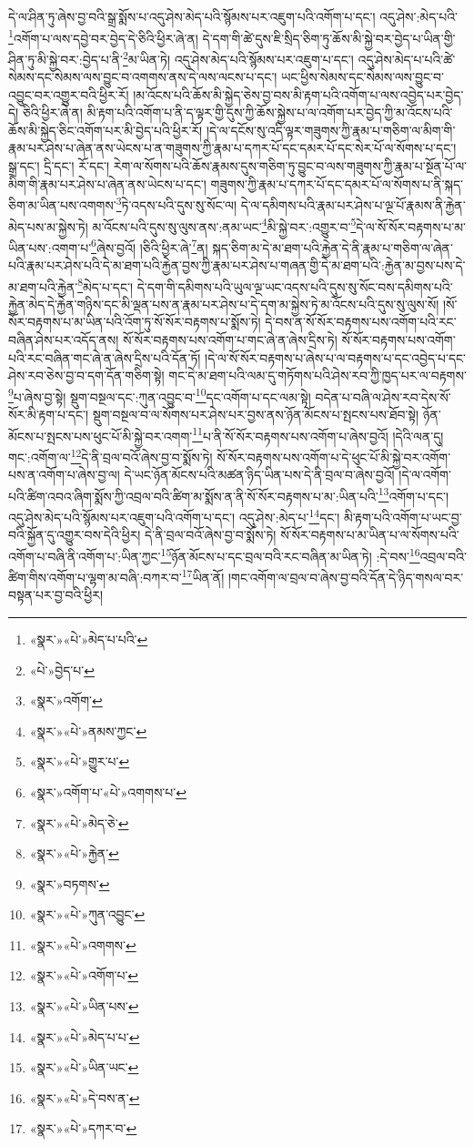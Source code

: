 དེ་ལ་ཤིན་ཏུ་ཞེས་བྱ་བའི་སྒྲ་སྨོས་པ་འདུ་ཤེས་མེད་པའི་སྙོམས་པར་འཇུག་པའི་འགོག་པ་དང་། འདུ་ཤེས་:མེད་པའི་\footnote{«སྣར་»«པེ་»མེད་པ་པའི་}འགོག་པ་ལས་དབྱེ་བར་བྱེད་དེ་ཅིའི་ཕྱིར་ཞེ་ན། དེ་དག་གི་ཚེ་དུས་ཇི་སྲིད་ཅིག་ཏུ་ཆོས་མི་སྐྱེ་བར་བྱེད་པ་ཡིན་གྱི་ཤིན་ཏུ་མི་སྐྱེ་བར་:བྱེད་པ་ནི་\footnote{«པེ་»བྱེད་པ་}མ་ཡིན་ཏེ། འདུ་ཤེས་མེད་པའི་སྙོམས་པར་འཇུག་པ་དང་། འདུ་ཤེས་མེད་པ་པའི་ཚེ་སེམས་དང་སེམས་ལས་བྱུང་བ་འགགས་ནས་དེ་ལས་ལངས་པ་དང་། ཡང་ཕྱིས་སེམས་དང་སེམས་ལས་བྱུང་བ་འབྱུང་བར་འགྱུར་བའི་ཕྱིར་རོ། །མ་འོངས་པའི་ཆོས་མི་སྐྱེད་ཅེས་བྱ་བས་མི་རྟག་པའི་འགོག་པ་ལས་འབྱེད་པར་བྱེད་དེ། ཅིའི་ཕྱིར་ཞེ་ན། མི་རྟག་པའི་འགོག་པ་ནི་ད་ལྟར་གྱི་དུས་ཀྱི་ཆོས་སྐྱེས་པ་ལ་འགོག་པར་བྱེད་ཀྱི་མ་འོངས་པའི་ཆོས་མི་སྐྱེད་ཅིང་འགོག་པར་མི་བྱེད་པའི་ཕྱིར་རོ། །དེ་ལ་དངོས་སུ་འདི་ལྟར་གཟུགས་ཀྱི་རྣམ་པ་གཅིག་ལ་མིག་གི་རྣམ་པར་ཤེས་པ་ཞེན་ནས་ཡེངས་པ་ན་གཟུགས་ཀྱི་རྣམ་པ་དཀར་པོ་དང་དམར་པོ་དང་སེར་པོ་ལ་སོགས་པ་དང་། སྒྲ་དང་། དྲི་དང་། རོ་དང་། རེག་ལ་སོགས་པའི་ཆོས་རྣམས་དུས་གཅིག་ཏུ་བྱུང་བ་ལས་གཟུགས་ཀྱི་རྣམ་པ་སྔོན་པོ་ལ་མིག་གི་རྣམ་པར་ཤེས་པ་ཞེན་ནས་ཡེངས་པ་དང་། གཟུགས་ཀྱི་རྣམ་པ་དཀར་པོ་དང་དམར་པོ་ལ་སོགས་པ་ནི་སྐད་ཅིག་མ་ཡིན་པས་འགགས་\footnote{«སྣར་»འགོག་}ཏེ་འདས་པའི་དུས་སུ་སོང་ལ། དེ་ལ་དམིགས་པའི་རྣམ་པར་ཤེས་པ་ལྔ་པོ་རྣམས་ནི་རྐྱེན་མེད་པས་མ་སྐྱེས་ཏེ། མ་འོངས་པའི་དུས་སུ་ལུས་ནས་:ནམ་ཡང་\footnote{«སྣར་»«པེ་»ནམས་ཀྱང་}མི་སྐྱེ་བར་:འགྱུར་བ་\footnote{«སྣར་»«པེ་»གྱུར་པ་}དེ་ལ་སོ་སོར་བརྟགས་པ་མ་ཡིན་པས་:འགག་པ་\footnote{«སྣར་»འགོག་པ་«པེ་»འགགས་པ་}ཞེས་བྱའོ། །ཅིའི་ཕྱིར་ཞེ་\footnote{«སྣར་»«པེ་»མེད་ཅེ་}ན། སྐད་ཅིག་མ་དེ་མ་ཐག་པའི་རྐྱེན་དེ་ནི་རྣམ་པ་གཅིག་ལ་ཞེན་པའི་རྣམ་པར་ཤེས་པའི་དེ་མ་ཐག་པའི་རྐྱེན་བྱས་ཀྱི་རྣམ་པར་ཤེས་པ་གཞན་གྱི་དེ་མ་ཐག་པའི་:རྐྱེན་མ་བྱས་པས་དེ་མ་ཐག་པའི་རྐྱེན་\footnote{«སྣར་»«པེ་»རྐྱེན་}མེད་པ་དང་། དེ་དག་གི་དམིགས་པའི་ཡུལ་ལྔ་ཡང་འདས་པའི་དུས་སུ་སོང་བས་དམིགས་པའི་རྐྱེན་མེད་དེ་རྐྱེན་གཉིས་དང་མི་ལྡན་པས་ན་རྣམ་པར་ཤེས་པ་དེ་དག་མ་སྐྱེས་ཏེ་མ་འོངས་པའི་དུས་སུ་ལུས་སོ། །སོ་སོར་བརྟགས་པ་མ་ཡིན་པའི་འོག་ཏུ་སོ་སོར་བརྟགས་པ་སྨོས་ཏེ། དེ་བས་ན་སོ་སོར་བརྟགས་པས་འགོག་པའི་རང་བཞིན་ཤེས་པར་འདོད་ནས། སོ་སོར་བརྟགས་པས་འགོག་པ་གང་ཞེ་ན་ཞེས་དྲིས་ཏེ། སོ་སོར་བརྟགས་པས་འགོག་པའི་རང་བཞིན་གང་ཞེ་ན་ཞེས་དྲིས་པའི་དོན་ཏོ། །དེ་ལ་སོ་སོར་བརྟགས་པ་ཞེས་པ་ལ་བརྟགས་པ་དང་འབྱེད་པ་དང་ཤེས་རབ་ཅེས་བྱ་བ་དག་དོན་གཅིག་སྟེ། གང་དེ་མ་ཐག་པའི་ལམ་དུ་གཏོགས་པའི་ཤེས་རབ་ཀྱི་ཁྱད་པར་ལ་བརྟགས་\footnote{«སྣར་»བཏགས་}པ་ཞེས་བྱ་སྟེ། སྡུག་བསྔལ་དང་:ཀུན་འབྱུང་བ་\footnote{«སྣར་»«པེ་»ཀུན་འབྱུང་}དང་འགོག་པ་དང་ལམ་སྟེ། བདེན་པ་བཞི་ལ་ཤེས་རབ་དེས་སོ་སོར་མི་རྟག་པ་དང་། སྡུག་བསྔལ་བ་ལ་སོགས་པར་ཤེས་པར་བྱས་ནས་ཉོན་མོངས་པ་སྤངས་པས་ཐོབ་སྟེ། ཉོན་མོངས་པ་སྤངས་པས་ཕུང་པོ་མི་སྐྱེ་བར་འགག་\footnote{«སྣར་»«པེ་»འགགས་}པ་ནི་སོ་སོར་བརྟགས་པས་འགོག་པ་ཞེས་བྱའོ། །དེའི་ལན་དུ། གང་:འགོག་ལ་\footnote{«སྣར་»«པེ་»འགོག་པ་}དེ་ནི་བྲལ་བའོ་ཞེས་བྱ་བ་སྨོས་ཏེ། སོ་སོར་བརྟགས་པས་འགོག་པ་དེ་ཕུང་པོ་མི་སྐྱེ་བར་འགོག་པས་ན་འགོག་པ་ཞེས་བྱ་ལ། དེ་ཡང་ཉོན་མོངས་པའི་མཚན་ཉིད་ཡིན་པས་དེ་ནི་བྲལ་བ་ཞེས་བྱའོ། །དེ་ལ་འགོག་པའི་ཚིག་འབའ་ཞིག་སྨོས་ཀྱི་འབྲལ་བའི་ཚིག་མ་སྨོས་ན་ནི་སོ་སོར་བརྟགས་པ་མ་:ཡིན་པའི་\footnote{«སྣར་»«པེ་»ཡིན་པས་}འགོག་པ་དང་། འདུ་ཤེས་མེད་པའི་སྙོམས་པར་འཇུག་པའི་འགོག་པ་དང་། འདུ་ཤེས་:མེད་པ་\footnote{«སྣར་»«པེ་»མེད་པ་པ་}དང་། མི་རྟག་པའི་འགོག་པ་ཡང་བྱ་བའི་སྐྱོན་དུ་འགྱུར་བས་དེའི་ཕྱིར། དེ་ནི་བྲལ་བའོ་ཞེས་བྱ་བ་སྨོས་ཏེ། སོ་སོར་བརྟགས་པ་མ་ཡིན་པ་ལ་སོགས་པའི་འགོག་པ་བཞི་ནི་འགོག་པ་:ཡིན་ཀྱང་\footnote{«སྣར་»«པེ་»ཡིན་ཡང་}ཉོན་མོངས་པ་དང་བྲལ་བའི་རང་བཞིན་མ་ཡིན་ཏེ། :དེ་བས་\footnote{«སྣར་»«པེ་»དེ་བས་ན་}འབྲལ་བའི་ཚིག་གིས་འགོག་པ་ལྷག་མ་བཞི་:བཀར་བ་\footnote{«སྣར་»«པེ་»དཀར་བ་}ཡིན་ནོ། །གང་འགོག་ལ་བྲལ་བ་ཞེས་བྱ་བའི་དོན་དེ་ཉིད་གསལ་བར་བསྟན་པར་བྱ་བའི་ཕྱིར། 